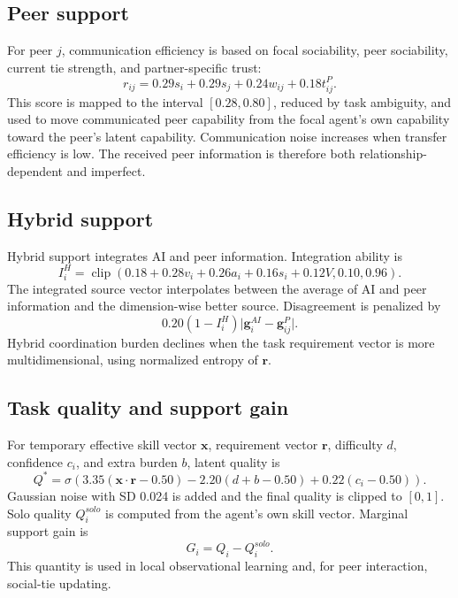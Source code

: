\documentclass[11pt]{article}
\newcommand{\clip}{\operatorname{clip}}
\newcommand{\sigm}{\sigma}
\begin{document}
\subsection{Peer support}
For peer $j$, communication efficiency is based on focal sociability, peer sociability, current tie strength, and partner-specific trust:
\begin{equation}
r_{ij}=0.29s_i+0.29s_j+0.24w_{ij}+0.18t_{ij}^{P}.
\end{equation}
This score is mapped to the interval $[0.28,0.80]$, reduced by task ambiguity, and used to move communicated peer capability from the focal agent's own capability toward the peer's latent capability. Communication noise increases when transfer efficiency is low. The received peer information is therefore both relationship-dependent and imperfect.

\subsection{Hybrid support}
Hybrid support integrates AI and peer information. Integration ability is
\begin{equation}
I_i^{H}=\clip(0.18+0.28v_i+0.26a_i+0.16s_i+0.12V,0.10,0.96).
\end{equation}
The integrated source vector interpolates between the average of AI and peer information and the dimension-wise better source. Disagreement is penalized by
\begin{equation}
0.20(1-I_i^{H})\lvert\mathbf g_i^{AI}-\mathbf g_{ij}^{P}\rvert.
\end{equation}
Hybrid coordination burden declines when the task requirement vector is more multidimensional, using normalized entropy of $\mathbf r$.

\subsection{Task quality and support gain}
For temporary effective skill vector $\mathbf{x}$, requirement vector $\mathbf r$, difficulty $d$, confidence $c_i$, and extra burden $b$, latent quality is
\begin{equation}
Q^{*}=\sigm\left(3.35(\mathbf{x}\cdot\mathbf r-0.50)-2.20(d+b-0.50)+0.22(c_i-0.50)\right).
\end{equation}
Gaussian noise with SD 0.024 is added and the final quality is clipped to $[0,1]$. Solo quality $Q_i^{solo}$ is computed from the agent's own skill vector. Marginal support gain is
\begin{equation}
G_i=Q_i-Q_i^{solo}.
\end{equation}
This quantity is used in local observational learning and, for peer interaction, social-tie updating.
\end{document}
